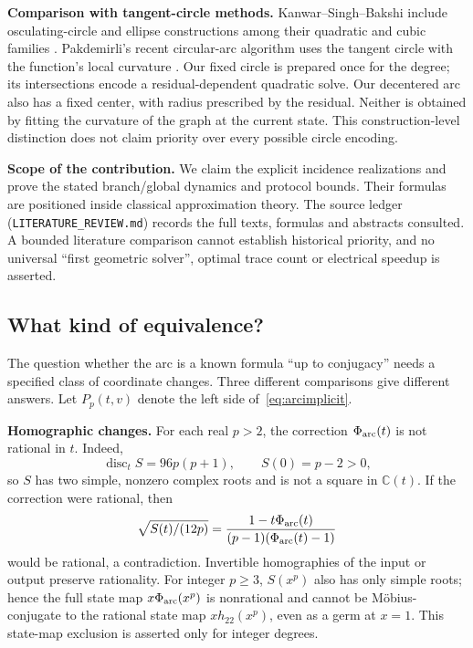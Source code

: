 \documentclass[11pt,a4paper]{article}
\begin{document}
\textbf{Comparison with tangent-circle methods.} Kanwar--Singh--Bakshi include osculating-circle and ellipse constructions among their quadratic and cubic families \cite{kanwar2008}. Pakdemirli's recent circular-arc algorithm uses the tangent circle with the function's local curvature \cite{pakdemirli2025}. Our fixed circle is prepared once for the degree; its intersections encode a residual-dependent quadratic solve. Our decentered arc also has a fixed center, with radius prescribed by the residual. Neither is obtained by fitting the curvature of the graph at the current state. This construction-level distinction does not claim priority over every possible circle encoding.

\textbf{Scope of the contribution.} We claim the explicit incidence realizations and prove the stated branch/global dynamics and protocol bounds. Their formulas are positioned inside classical approximation theory. The source ledger (\texttt{LITERATURE\_REVIEW.md}) records the full texts, formulas and abstracts consulted. A bounded literature comparison cannot establish historical priority, and no universal ``first geometric solver'', optimal trace count or electrical speedup is asserted.

\clearpage
\subsection{What kind of equivalence?}\label{sec:equivalence}
The question whether the arc is a known formula ``up to conjugacy'' needs a specified class of coordinate changes. Three different comparisons give different answers. Let $P_p(t,v)$ denote the left side of~\eqref{eq:arcimplicit}.

\textbf{Homographic changes.} For each real $p>2$, the correction $\Phi_{\rm arc}(t)$ is not rational in $t$. Indeed,
\[
 \operatorname{disc}_t S=96p(p+1),\qquad S(0)=p-2>0,
\]
so $S$ has two simple, nonzero complex roots and is not a square in $\mathbb C(t)$. If the correction were rational, then
\[
 \sqrt{S(t)/(12p)}=\frac{1-t\Phi_{\rm arc}(t)}{(p-1)(\Phi_{\rm arc}(t)-1)}
\]
would be rational, a contradiction. Invertible homographies of the input or output preserve rationality. For integer $p\ge3$, $S(x^p)$ also has only simple roots; hence the full state map $x\Phi_{\rm arc}(x^p)$ is nonrational and cannot be M\"obius-conjugate to the rational state map $x h_{22}(x^p)$, even as a germ at $x=1$. This state-map exclusion is asserted only for integer degrees.
\end{document}
